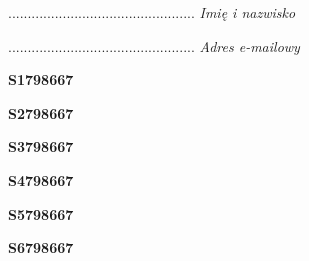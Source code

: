 \begin{turn}{90}\begin{minipage}{\linewidth} \vspace{20mm} ................................................  \textit{Imię i nazwisko}\end{minipage}\end{turn}

\begin{turn}{90}\begin{minipage}{\linewidth} \vspace{20mm} ................................................  \textit{Adres e-mailowy}\end{minipage}\end{turn}

\begin{turn}{90}\huge \begin{minipage}{\linewidth} \vspace{10mm}\textbf{S1798667}\end{minipage}\end{turn}

\begin{turn}{90}\huge \begin{minipage}{\linewidth} \vspace{10mm}\textbf{S2798667}\end{minipage}\end{turn}

\begin{turn}{90}\huge \begin{minipage}{\linewidth} \vspace{10mm}\textbf{S3798667}\end{minipage}\end{turn}

\begin{turn}{90}\huge \begin{minipage}{\linewidth} \vspace{10mm}\textbf{S4798667}\end{minipage}\end{turn}

\begin{turn}{90}\huge \begin{minipage}{\linewidth} \vspace{10mm}\textbf{S5798667}\end{minipage}\end{turn}

\begin{turn}{90}\huge \begin{minipage}{\linewidth} \vspace{10mm}\textbf{S6798667}\end{minipage}\end{turn}

